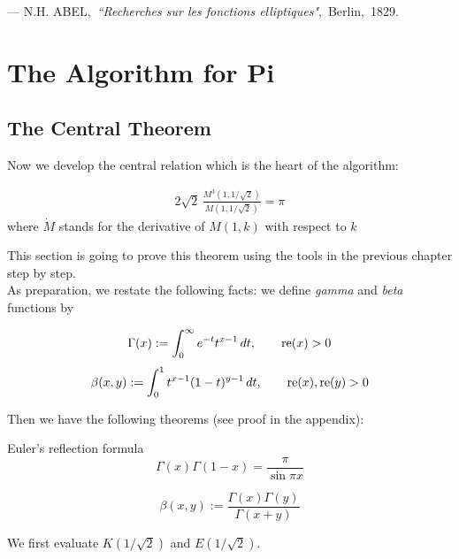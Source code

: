 \documentclass{report}
\begin{document}
\begin{titlepage}
{{		\medskip
		{\sffamily\upshape --- N.H. ABEL,~{\it ``Recherches sur les fonctions elliptiques"}\cite{Abel:1992aa},~Berlin,~1829.}
	}	

}

\eject



\chapter{The Algorithm for Pi}
\section{The Central Theorem\hfill}
Now we develop the central relation which is the heart of the algorithm:
\begin{T}\label{thm:central}{\rm\cite{Borwein:1987aa}}
\begin{align}
2\sqrt2\,\frac{M^3(1,1/\sqrt2)}{\dot M(1,1/\sqrt 2)}=\pi
\end{align}
where $\dot M$ stands for the derivative of $M(1,k)$ with respect to $k$
\end{T} 
This section is going to prove this theorem using the tools in the previous chapter step by step.
\bigskip\\
As preparation, we restate the following facts: we define {\it gamma} and {\it beta} functions by
\begin{D}{\rm\cite{Borwein:1987aa}}
\[
\Gamma(x):=\int_0^{\infty}e^{-t}t^{x-1}\,dt,\qquad {\rm re}(x)>0
\]
\[
\beta(x,y):=\int_0^1t^{x-1}(1-t)^{y-1}\,dt,\qquad {\rm re}(x),{\rm re}(y)>0
\]
\end{D}
Then we have the following theorems (see proof in the appendix):
\begin{T}{ Euler's reflection formula}{\rm\cite{Borwein:1987aa}\cite{Rudin:1976aa}}\label{thm:euler}
\[\Gamma(x)\Gamma(1-x)=\frac{\pi}{\sin\pi x}\]
\end{T}
\begin{T}{\rm\cite{Borwein:1987aa}\cite{Rudin:1976aa}}\label{thm:beta}
\[\beta(x,y):=\frac{\Gamma(x)\Gamma(y)}{\Gamma(x+y)}\]
\end{T}\bigskip

We first evaluate $K(1/\sqrt2)$ and $E(1/\sqrt2)$.\smallskip


\end{titlepage}
\end{document}
